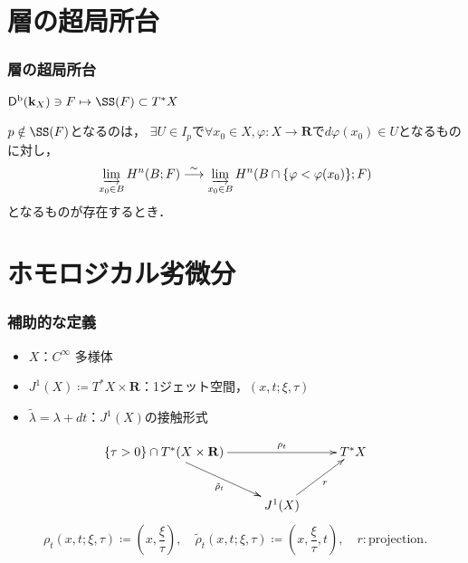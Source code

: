\documentclass[dvipdfmx,12pt,aspectratio=169,leqno]{beamer}%
\newcommand{\rr}{\mathbf{R}}
\newcommand{\kk}{\mathbf{k}}
\numberwithin{equation}{subsection}
\newcommand{\Dompb}{\mathop{\mathsf{D}^\mathrm{b}}\nolimits}
\newcommand{\simarr}{\mathrel{\overset{\sim}{\longrightarrow}}}%
\newcommand{\indlim}[1][]{\mathop{\varinjlim}\limits_{#1}}
\theoremstyle{mystyle}
\begin{document}
\section{層の超局所台}
\begin{frame}\frametitle{層の超局所台}
    \(\Dompb(\kk_X)\ni F\mapsto \SS(F)\subset T^{\ast}X\)
    \begin{Definition}[層の超局所台]
        \(p\notin \SS(F)\)となるのは，
        \(\exists U\in I_{p}\)で\(
            \forall x_0\in X,
            \varphi\colon X\to\rr
        \)で\(d\varphi(x_0)\in U\)となるものに対し，\[
            \indlim[x_0\in B]H^{n}(B;F)\simarr
            \indlim[x_0\in B]H^{n}(B\cap \{\varphi<\varphi(x_0)\};F)
        \]
        となるものが存在するとき．
    \end{Definition}
\end{frame}


\section[劣微分]{ホモロジカル劣微分}

\begin{frame}
    \frametitle{補助的な定義}

    \begin{itemize}
        \item \(X\)：\(C^\infty\) 多様体
        \item \(J^{1}(X)\coloneqq T^{\ast}X\times \rr\)：1ジェット空間，\((x,t;\xi,\tau)\)
        \item \(\tilde{\lambda}=\lambda+dt\)：\(J^{1}(X)\)の接触形式
    \end{itemize}
    
    \[
        \vcenter{\xymatrix@C=26pt@R=26pt{
        \left\{\tau>0\right\}\cap T^{\ast}(X\times\rr)
        \ar[rd]_-{\tilde{\rho}_{t}}
        \ar[rr]^-{\rho_{t}}
        &&
        T^{\ast}X
        \\
        &
        J^{1}(X)
        \ar[ru]_-{r}
      }}
    \]
    \[
        \rho_{t}\left(x,t;\xi,\tau\right)
        \coloneqq
        \left(x,\frac{\xi}{\tau}\right),
        \quad
        \tilde{\rho}_{t}\left(x,t;\xi,\tau\right)
        \coloneqq
        \left(x,\frac{\xi}{\tau},t\right),
        \quad
        r\colon\text{projection}.
    \]

\end{frame}
\end{document}
